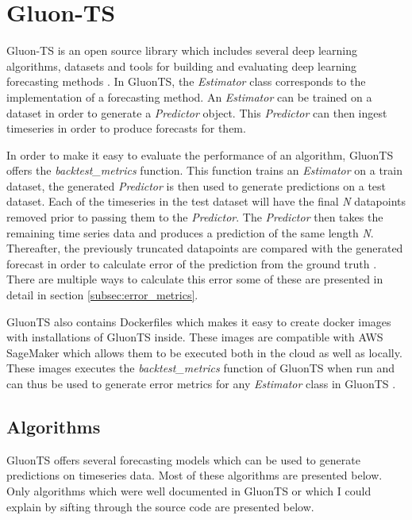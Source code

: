 \section{Gluon-TS}
\label{subsec:gluonts_overview}
Gluon-TS is an open source library which includes several deep learning algorithms, datasets and tools for building and evaluating deep learning forecasting methods \cite{gluonts-website,gluonts_paper,gluonts-github}. In GluonTS, the \textit{Estimator} class corresponds to the implementation of a forecasting method. An \textit{Estimator} can be trained on a dataset in order to generate a \textit{Predictor} object. This \textit{Predictor} can then ingest timeseries in order to produce forecasts for them.

In order to make it easy to evaluate the performance of an algorithm, GluonTS offers the \textit{backtest\_metrics} function. This function trains an \textit{Estimator} on a train dataset, the generated \textit{Predictor} is then used to generate predictions on a test dataset. Each of the timeseries in the test dataset will have the final \textit{N} datapoints removed prior to passing them to the \textit{Predictor}. The \textit{Predictor} then takes the remaining time series data and produces a prediction of the same length \textit{N}. Thereafter, the previously truncated datapoints are compared with the generated forecast in order to calculate error of the prediction from the ground truth \cite{gluonts-github}. There are multiple ways to calculate this error some of these are presented in detail in section \ref{subsec:error_metrics}.

GluonTS also contains Dockerfiles which makes it easy to create docker images with installations of GluonTS inside. These images are compatible with AWS SageMaker which allows them to be executed both in the cloud as well as locally. These images executes the \textit{backtest\_metrics} function of GluonTS when run and can thus be used to generate error metrics for any \textit{Estimator} class in GluonTS \cite{gluonts-github}.

\subsection{Algorithms}
\label{algorithms}
GluonTS offers several forecasting models which can be used to generate predictions on timeseries data. Most of these algorithms are presented below. Only algorithms which were well documented in GluonTS or which I could explain by sifting through the source code are presented below.

